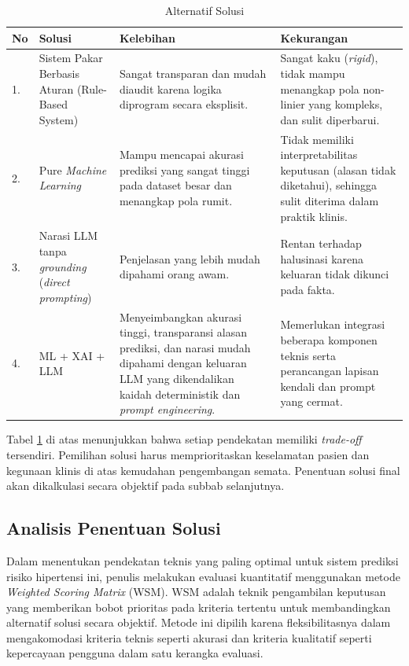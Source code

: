 \begin{table}[H]
    \caption{Alternatif Solusi}
    \label{tab:alternatif-solusi}
    \centering
    \small
    \begin{tabular}{|p{0.5cm}|p{3.5cm}|p{4.5cm}|p{4.5cm}|}
        \hline
        \textbf{No} & \textbf{Solusi} & \textbf{Kelebihan} & \textbf{Kekurangan} \\
        \hline
        1. & Sistem Pakar Berbasis Aturan (Rule-Based System) & Sangat transparan dan mudah diaudit karena logika diprogram secara eksplisit. & Sangat kaku (\emph{rigid}), tidak mampu menangkap pola non-linier yang kompleks, dan sulit diperbarui. \\
        \hline
        2. & Pure \textit{Machine Learning}  & Mampu mencapai akurasi prediksi yang sangat tinggi pada dataset besar dan menangkap pola rumit. & Tidak memiliki interpretabilitas keputusan (alasan tidak diketahui), sehingga sulit diterima dalam praktik klinis. \\
        \hline
        3. & Narasi LLM tanpa \emph{grounding} (\textit{direct prompting}) & Penjelasan yang lebih mudah dipahami orang awam. & Rentan terhadap halusinasi karena keluaran tidak dikunci pada fakta. \\
        \hline
        4. & ML + XAI + LLM & Menyeimbangkan akurasi tinggi, transparansi alasan prediksi, dan narasi mudah dipahami dengan keluaran LLM yang dikendalikan kaidah deterministik dan \textit{prompt engineering}. & Memerlukan integrasi beberapa komponen teknis serta perancangan lapisan kendali dan prompt yang cermat. \\
        \hline
    \end{tabular}
\end{table}

Tabel \ref{tab:alternatif-solusi} di atas menunjukkan bahwa setiap pendekatan memiliki \emph{trade-off} tersendiri. Pemilihan solusi harus memprioritaskan keselamatan pasien dan kegunaan klinis di atas kemudahan pengembangan semata. Penentuan solusi final akan dikalkulasi secara objektif pada subbab selanjutnya.

\subsection{Analisis Penentuan Solusi}
Dalam menentukan pendekatan teknis yang paling optimal untuk sistem prediksi risiko hipertensi ini, penulis melakukan evaluasi kuantitatif menggunakan metode \emph{Weighted Scoring Matrix} (WSM). WSM adalah teknik pengambilan keputusan yang memberikan bobot prioritas pada kriteria tertentu untuk membandingkan alternatif solusi secara objektif. Metode ini dipilih karena fleksibilitasnya dalam mengakomodasi kriteria teknis seperti akurasi dan kriteria kualitatif seperti kepercayaan pengguna dalam satu kerangka evaluasi.


